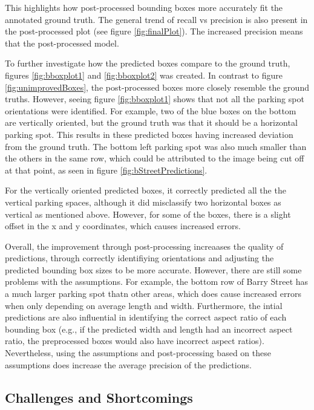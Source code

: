 \documentclass[man]{apa7}
\begin{document}
This highlights how post-processed bounding boxes more accurately fit the annotated ground truth. The general trend of recall vs precision is also present in the post-processed plot (see figure \ref{fig:finalPlot}). The increased precision means that the post-processed model.

To further investigate how the predicted boxes compare to the ground truth, figures \ref{fig:bboxplot1} and \ref{fig:bboxplot2} was created. In contrast to figure \ref{fig:unimprovedBoxes}, the post-processed boxes more closely resemble the ground truths. However, seeing figure \ref{fig:bboxplot1} shows that not all the parking spot orientations were identified. For example, two of the blue boxes on the bottom are vertically oriented, but the ground truth was that it should be a horizontal parking spot. This results in these predicted boxes having increased deviation from the ground truth. The bottom left parking spot was also much smaller than the others in the same row, which could be attributed to the image being cut off at that point, as seen in figure \ref{fig:bStreetPredictions}. 

For the vertically oriented predicted boxes, it correctly predicted all the the vertical parking spaces, although it did misclassify two horizontal boxes as vertical as mentioned above. However, for some of the boxes, there is a slight offset in the x and y coordinates, which causes increased errors.

Overall, the improvement through post-processing increaases the quality of predictions, through correctly identifiying orientations and adjusting the predicted bounding box sizes to be more accurate. However, there are still some problems with the assumptions. For example, the bottom row of Barry Street has a much larger parking spot thatn other areas, which does cause increased errors when only depending on average length and width. Furthermore, the intial predictions are also influential in identifying the correct aspect ratio of each bounding box (e.g., if the predicted width and length had an incorrect aspect ratio, the preprocessed boxes would also have incorrect aspect ratios). Nevertheless, using the assumptions and post-processing based on these assumptions does increase the average precision of the predictions.

\subsection{Challenges and Shortcomings}
\end{document}
